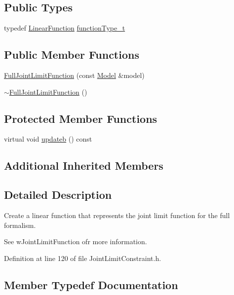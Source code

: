 \subsection*{Public Types}
\begin{DoxyCompactItemize}
\item 
typedef \hyperlink{classocra_1_1LinearFunction}{Linear\+Function} \hyperlink{classocra_1_1FullJointLimitFunction_a3ae743a316981d67933248a9d58f58fb}{function\+Type\+\_\+t}
\end{DoxyCompactItemize}
\subsection*{Public Member Functions}
\begin{DoxyCompactItemize}
\item 
\hyperlink{classocra_1_1FullJointLimitFunction_af49c77d067fe584cf6d3884eb33b2ed0}{Full\+Joint\+Limit\+Function} (const \hyperlink{classocra_1_1Model}{Model} \&model)
\item 
\hyperlink{classocra_1_1FullJointLimitFunction_a84cc9b5e7efdf78fe9a279ef5940871b}{$\sim$\+Full\+Joint\+Limit\+Function} ()
\end{DoxyCompactItemize}
\subsection*{Protected Member Functions}
\begin{DoxyCompactItemize}
\item 
virtual void \hyperlink{classocra_1_1FullJointLimitFunction_ae08fb117e700fded02bdaa36402c79b8}{updateb} () const 
\end{DoxyCompactItemize}
\subsection*{Additional Inherited Members}


\subsection{Detailed Description}
Create a linear function that represents the joint limit function for the full formalism. 

See w\+Joint\+Limit\+Function ofr more information. 

Definition at line 120 of file Joint\+Limit\+Constraint.\+h.



\subsection{Member Typedef Documentation}
